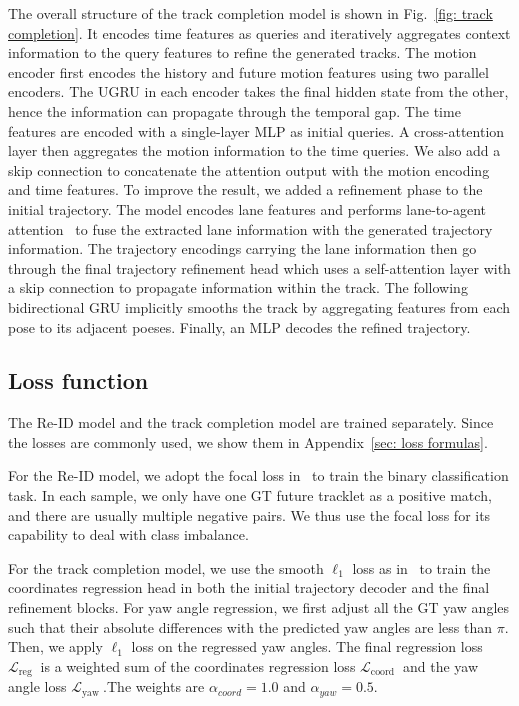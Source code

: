 \documentclass{article} \usepackage{iclr2023_conference,times}
\begin{document}
The overall structure of the track completion model is shown in  Fig.~\ref{fig: track completion}. It encodes time features as queries and iteratively aggregates context information to the query features to refine the generated tracks. The motion encoder first encodes the history and future motion features using two parallel encoders. The UGRU in each encoder takes the final hidden state from the other, hence the information can propagate through the temporal gap. The time features are encoded with a single-layer MLP as initial queries. A cross-attention layer then aggregates the motion information to the time queries. We also add a skip connection to concatenate the attention output with the motion encoding and time features. To improve the result, we added a refinement phase to the initial trajectory. The model encodes lane features and performs lane-to-agent attention~\cite{laneGCN} to fuse the extracted lane information with the generated trajectory information. The trajectory encodings carrying the lane information then go through the final trajectory refinement head which uses a self-attention layer with a skip connection to propagate information within the track. The following bidirectional GRU implicitly smooths the track by aggregating features from each pose to its adjacent poeses. Finally, an MLP decodes the refined trajectory.

\vspace{-1mm}
\subsection{Loss function}
\vspace{-1mm}
The Re-ID model and the track completion model are trained separately. Since the losses are commonly used, we show them in  Appendix~\ref{sec: loss formulas}.

For the Re-ID model, we adopt the focal loss in~\cite{focal_loss} to train the binary classification task. In each sample, we only have one GT future tracklet as a positive match, and there are usually multiple negative pairs. We thus use the focal loss for its capability to deal with class imbalance. 

For the track completion model, we use the smooth $\ell_1$ loss as in~\cite{DCMS,laneGCN} to train the coordinates regression head in both the initial trajectory decoder and the final refinement blocks. For yaw angle regression, we first adjust all the GT yaw angles such that their absolute differences with the predicted yaw angles are less than $\pi$. Then, we apply $\ell_1$ loss on the regressed yaw angles. The final regression loss $\mathcal{L}_{\text {reg }}$ is a weighted sum of the coordinates regression loss $\mathcal{L}_{\text {coord }}$ and the yaw angle loss $\mathcal{L}_{\text {yaw }}$.The weights are $\alpha_{coord}=1.0$ and $\alpha_{yaw}=0.5$.
\end{document}

